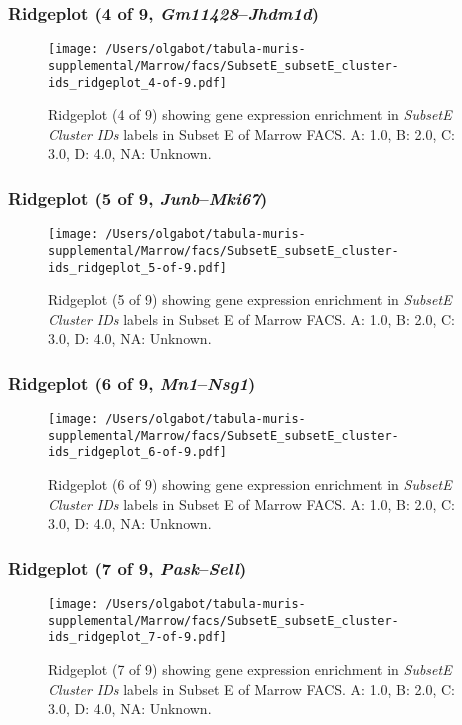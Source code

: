\clearpage

\subsubsection{Ridgeplot (4 of 9, \emph{Gm11428}--\emph{Jhdm1d})}
\begin{figure}[h]
\centering
\texttt{[image: /Users/olgabot/tabula-muris-supplemental/Marrow/facs/SubsetE\_subsetE\_cluster-ids\_ridgeplot\_4-of-9.pdf]}

\caption{ Ridgeplot (4 of 9)  showing gene expression enrichment in \emph{SubsetE Cluster IDs} labels in Subset E of Marrow FACS. A: 1.0, B: 2.0, C: 3.0, D: 4.0, NA: Unknown.}
\end{figure}


\clearpage

\subsubsection{Ridgeplot (5 of 9, \emph{Junb}--\emph{Mki67})}
\begin{figure}[h]
\centering
\texttt{[image: /Users/olgabot/tabula-muris-supplemental/Marrow/facs/SubsetE\_subsetE\_cluster-ids\_ridgeplot\_5-of-9.pdf]}

\caption{ Ridgeplot (5 of 9)  showing gene expression enrichment in \emph{SubsetE Cluster IDs} labels in Subset E of Marrow FACS. A: 1.0, B: 2.0, C: 3.0, D: 4.0, NA: Unknown.}
\end{figure}


\clearpage

\subsubsection{Ridgeplot (6 of 9, \emph{Mn1}--\emph{Nsg1})}
\begin{figure}[h]
\centering
\texttt{[image: /Users/olgabot/tabula-muris-supplemental/Marrow/facs/SubsetE\_subsetE\_cluster-ids\_ridgeplot\_6-of-9.pdf]}

\caption{ Ridgeplot (6 of 9)  showing gene expression enrichment in \emph{SubsetE Cluster IDs} labels in Subset E of Marrow FACS. A: 1.0, B: 2.0, C: 3.0, D: 4.0, NA: Unknown.}
\end{figure}


\clearpage

\subsubsection{Ridgeplot (7 of 9, \emph{Pask}--\emph{Sell})}
\begin{figure}[h]
\centering
\texttt{[image: /Users/olgabot/tabula-muris-supplemental/Marrow/facs/SubsetE\_subsetE\_cluster-ids\_ridgeplot\_7-of-9.pdf]}

\caption{ Ridgeplot (7 of 9)  showing gene expression enrichment in \emph{SubsetE Cluster IDs} labels in Subset E of Marrow FACS. A: 1.0, B: 2.0, C: 3.0, D: 4.0, NA: Unknown.}
\end{figure}


